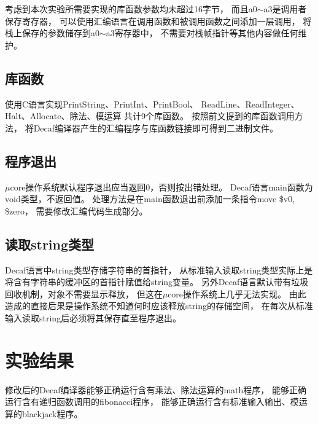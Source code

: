         考虑到本次实验所需要实现的库函数参数均未超过16字节，%
        而且a0$\sim$a3是调用者保存寄存器，%
        可以使用汇编语言在调用函数和被调用函数之间添加一层调用，%
        将栈上保存的参数储存到a0$\sim$a3寄存器中，%
        不需要对栈帧指针等其他内容做任何维护。

    \subsection{库函数}
        使用C语言实现PrintString、PrintInt、PrintBool、%
        ReadLine、ReadInteger、Halt、Allocate、除法、模运算%
        共计9个库函数。%
        按照前文提到的库函数调用方法，%
        将Decaf编译器产生的汇编程序与库函数链接即可得到二进制文件。

    \subsection{程序退出}
        $\mu$core操作系统默认程序退出应当返回0，否则按出错处理。%
        Decaf语言main函数为void类型，不返回值。%
        处理方法是在main函数退出前添加一条指令move \$v0, \$zero，%
        需要修改汇编代码生成部分。

    \subsection{读取string类型}
        Decaf语言中string类型存储字符串的首指针，%
        从标准输入读取string类型实际上是%
        将含有字符串的缓冲区的首指针赋值给string变量。%
        另外Decaf语言默认带有垃圾回收机制，对象不需要显示释放，%
        但这在$\mu$core操作系统上几乎无法实现。%
        由此造成的直接后果是操作系统不知道何时应该释放string的存储空间，%
        在每次从标准输入读取string后必须将其保存直至程序退出。


\section{实验结果}
    修改后的Decaf编译器能够正确运行含有乘法、除法运算的math程序，%
    能够正确运行含有递归函数调用的fibonacci程序，%
    能够正确运行含有标准输入输出、模运算的blackjack程序。


